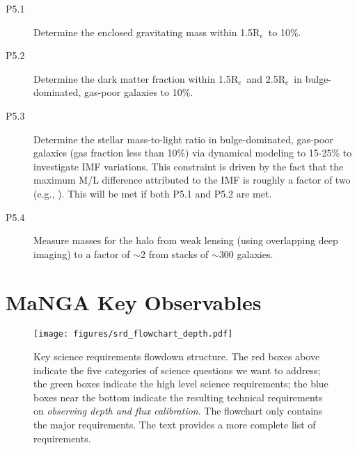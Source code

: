 \documentclass[preprint,11pt]{aastex}
\newcommand{\Reff}{{R$_{e}$}}
\begin{document}
\begin{description}


\item[P5.1] Determine the enclosed gravitating mass within 1.5\Reff\
  to
  10\%. %

\item[P5.2] Determine the dark matter fraction within 1.5\Reff\ and 2.5\Reff\ in
  bulge-dominated, gas-poor galaxies to 10\%.

\item[P5.3] Determine the stellar mass-to-light ratio in
  bulge-dominated, gas-poor galaxies (gas fraction less than 10\%) via
  dynamical modeling to 15-25\% to investigate IMF variations.  This
  constraint is driven by the fact that the maximum M/L difference
  attributed to the IMF is roughly a factor of two (e.g., \citealt{conroy2012}). This will be met if both P5.1 and P5.2 are
  met.


\item[P5.4] Measure masses for the halo from weak lensing (using overlapping deep
  imaging) to a factor of $\sim 2$ from stacks of $\sim 300$ galaxies.


\end{description}



\section{MaNGA Key Observables}\label{sec:key_observables}

\begin{figure*}
\begin{center}
\texttt{[image: figures/srd\_flowchart\_depth.pdf]}
\caption{Key science requirements flowdown structure. The red boxes above indicate the five categories of science questions we want to address; the green boxes indicate the high level science requirements; the blue boxes near the bottom indicate the resulting technical requirements on {\it observing depth and flux calibration}. The flowchart only contains the major requirements. The text provides a more complete list of requirements.}
\label{fig:srd_flowchart_depth}
\end{center}
\end{figure*}
\end{document}
